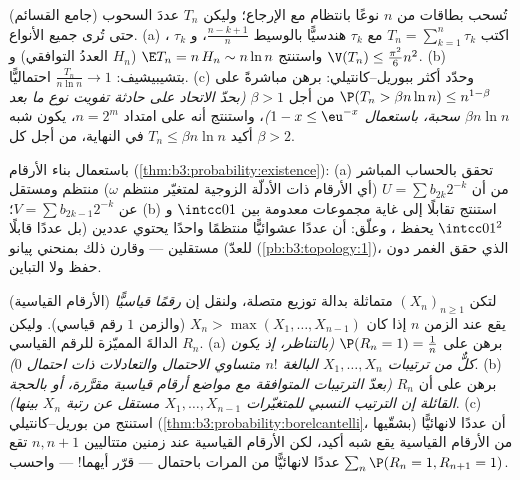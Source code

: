 \begin{exercise}[$\star\star\star$]\label{exo:b3:probability:9}
(جامع القسائم) تُسحب بطاقات من $n$ نوعًا بانتظام مع الإرجاع؛
وليكن $T_n$ عددَ السحوب حتى تُرى جميع الأنواع.
(a) اكتب $T_n = \sum_{k=1}^{n}\tau_k$ مع $\tau_k$ هندسيًّا بالوسيط $\frac{n - k + 1}n$،
و $\tau_k$ ، واستنتج $\E T_n = n\,H_n \sim n\ln n$ ($H_n$ العددُ التوافقي)
و $\V(T_n) \leq
\frac{\pi^2}6n^2$.
(b) بتشيبيشيف: $\frac{T_n}{n\ln n} \to 1$ احتماليًّا.
(c) وحدّد أكثر ببوريل--كانتيلي: برهن مباشرةً على $\P(T_n >
\beta n\ln n) \leq n^{1 - \beta}$ من أجل
$\beta > 1$ \emph{(بحدّ الاتحاد على حادثة تفويت نوع ما بعد
$\beta n\ln n$ سحبة، باستعمال $1 - x \leq \eu^{-x}$)}، واستنتج أنه على امتداد
$n = 2^m$، يكون شبه أكيد $T_n \leq \beta n\ln
n$ في النهاية، من أجل كل
$\beta > 2$.
\end{exercise}

\begin{exercise}[$\star\star$]\label{exo:b3:probability:10}
باستعمال بناء الأرقام (\cref{thm:b3:probability:existence}):
(a) تحقق بالحساب المباشر من أن $U = \sum b_{2k}2^{-k}$ (أي الأرقام ذات الأدلّة
الزوجية لمتغيّر منتظم $\omega$) منتظم ومستقل عن $V = \sum b_{2k-1}2^{-k}$؛
(b) استنتج تقابلًا  إلى غاية مجموعات معدومة بين
$\intcc01$ و $\intcc01^2$ يحفظ ، وعلّق: أن عددًا عشوائيًّا
منتظمًا واحدًا يحتوي عددين (بل عددًا قابلًا للعدّ) مستقلين --- وقارن
ذلك بمنحني پيانو (\cref{pb:b3:topology:1})، الذي حقق الغمر دون حفظ 
ولا التباين.
\end{exercise}

\begin{exercise}[$\star\star$]\label{exo:b3:probability:11}
(الأرقام القياسية) لتكن $(X_n)_{n\geq1}$  متماثلة بدالة
توزيع متصلة، ولنقل إن \emph{رقمًا قياسيًّا} يقع عند الزمن $n$
إذا كان $X_n > \max(X_1, \dots, X_{n-1})$ (والزمن $1$ رقم قياسي). وليكن $R_n$ الدالةَ
المميّزة للرقم القياسي.
(a) برهن على $\P(R_n = 1) = \frac1n$ \emph{(بالتناظر، إذ يكون كلٌّ من ترتيبات
$X_1, \dots, X_n$ البالغة $n!$ متساوي الاحتمال والتعادلات ذات احتمال
$0$)}.
(b) برهن على أن $R_n$ \emph{} \emph{(بعدّ الترتيبات
المتوافقة مع مواضع أرقام قياسية مقرَّرة، أو بالحجة القائلة إن
الترتيب النسبي للمتغيّرات $X_1, \dots, X_{n-1}$ مستقل عن رتبة $X_n$ بينها)}.
(c) استنتج من بوريل--كانتيلي (\cref{thm:b3:probability:borelcantelli}، بشقّيها) أن عددًا
لانهائيًّا من الأرقام القياسية يقع شبه أكيد، لكن الأرقام
القياسية عند زمنين متتاليين $n, n+1$ تقع عددًا لانهائيًّا من
المرات باحتمال --- قرّر أيهما! --- واحسب $\sum_n\P(R_n = 1, R_{n+1} = 1)$.
\end{exercise}

